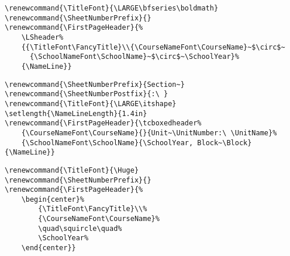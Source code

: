 \documentclass[12pt,twoside,parskip,notitle,showframe]{handout}
\begin{document}
\begingroup
\renewcommand{\TitleFont}{\LARGE\bfseries\boldmath}
\renewcommand{\SheetNumberPrefix}{}
\renewcommand{\FirstPageHeader}{%
	\LSheader%
	{{\TitleFont\FancyTitle}\\{\CourseNameFont\CourseName}~$\circ$~{\SchoolNameFont\SchoolName}~$\circ$~\SchoolYear}%
	{\NameLine}}
\maketitle
\singlespacing
\begin{verbatim}
\renewcommand{\TitleFont}{\LARGE\bfseries\boldmath}
\renewcommand{\SheetNumberPrefix}{}
\renewcommand{\FirstPageHeader}{%
    \LSheader%
    {{\TitleFont\FancyTitle}\\{\CourseNameFont\CourseName}~$\circ$~
      {\SchoolNameFont\SchoolName}~$\circ$~\SchoolYear}%
    {\NameLine}}
\end{verbatim}
\endgroup
\newpage

\begingroup
\renewcommand{\SheetNumberPrefix}{Section~}
\renewcommand{\SheetNumberPostfix}{:\ }
\renewcommand{\TitleFont}{\LARGE\itshape}
\setlength{\NameLineLength}{1.4in}
\renewcommand{\FirstPageHeader}{\tcboxedheader{\CourseNameFont\CourseName}{}{Unit~\UnitNumber:\ \UnitName}{\SchoolNameFont\SchoolName}{\SchoolYear, Block~\Block}{\NameSpace}}
\maketitle
\singlespacing
\begin{verbatim}
\renewcommand{\SheetNumberPrefix}{Section~}
\renewcommand{\SheetNumberPostfix}{:\ }
\renewcommand{\TitleFont}{\LARGE\itshape}
\setlength{\NameLineLength}{1.4in}
\renewcommand{\FirstPageHeader}{\tcboxedheader%
    {\CourseNameFont\CourseName}{}{Unit~\UnitNumber:\ \UnitName}%
    {\SchoolNameFont\SchoolName}{\SchoolYear, Block~\Block}{\NameLine}}
\end{verbatim}
\endgroup

\newpage

\begingroup
\renewcommand{\TitleFont}{\Huge}
\renewcommand{\SheetNumberPrefix}{}
\renewcommand{\FirstPageHeader}{%
	\begin{center}%
		{\TitleFont\FancyTitle}\\%
		{\CourseNameFont\CourseName}%
		\quad\squircle\quad%
		\SchoolYear%
	\end{center}}
\maketitle
\singlespacing
\begin{verbatim}
\renewcommand{\TitleFont}{\Huge}
\renewcommand{\SheetNumberPrefix}{}
\renewcommand{\FirstPageHeader}{%
    \begin{center}%
        {\TitleFont\FancyTitle}\\%
        {\CourseNameFont\CourseName}%
        \quad\squircle\quad%
        \SchoolYear%
    \end{center}}
\end{verbatim}
\endgroup
\end{document}
